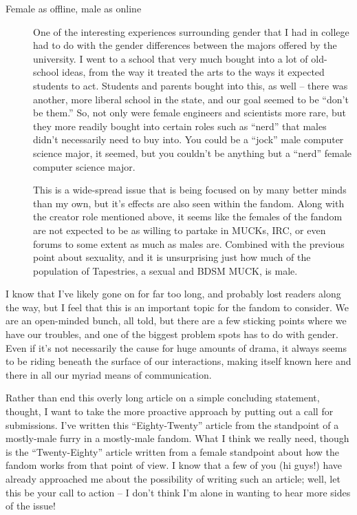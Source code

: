 \begin{description}
  \item[Female as offline, male as online]
  One of the interesting experiences surrounding gender that I had in college had to do with the gender differences between the majors offered by the university. I went to a school that very much bought into a lot of old-school ideas, from the way it treated the arts to the ways it expected students to act. Students and parents bought into this, as well -- there was another, more liberal school in the state, and our goal seemed to be ``don’t be them.'' So, not only were female engineers and scientists more rare, but they more readily bought into certain roles such as ``nerd'' that males didn’t necessarily need to buy into. You could be a ``jock'' male computer science major, it seemed, but you couldn’t be anything but a ``nerd'' female computer science major.

  This is a wide-spread issue that is being focused on by many better minds than my own, but it’s effects are also seen within the fandom. Along with the creator role mentioned above, it seems like the females of the fandom are not expected to be as willing to partake in MUCKs, IRC, or even forums to some extent as much as males are. Combined with the previous point about sexuality, and it is unsurprising just how much of the population of Tapestries, a sexual and BDSM MUCK, is male.
\end{description}

I know that I’ve likely gone on for far too long, and probably lost readers along the way, but I feel that this is an important topic for the fandom to consider. We are an open-minded bunch, all told, but there are a few sticking points where we have our troubles, and one of the biggest problem spots has to do with gender. Even if it’s not necessarily the cause for huge amounts of drama, it always seems to be riding beneath the surface of our interactions, making itself known here and there in all our myriad means of communication.

Rather than end this overly long article on a simple concluding statement, thought, I want to take the more proactive approach by putting out a call for submissions. I’ve written this ``Eighty-Twenty'' article from the standpoint of a mostly-male furry in a mostly-male fandom. What I think we really need, though is the ``Twenty-Eighty'' article written from a female standpoint about how the fandom works from that point of view. I know that a few of you (hi guys!) have already approached me about the possibility of writing such an article; well, let this be your call to action -- I don’t think I’m alone in wanting to hear more sides of the issue!
